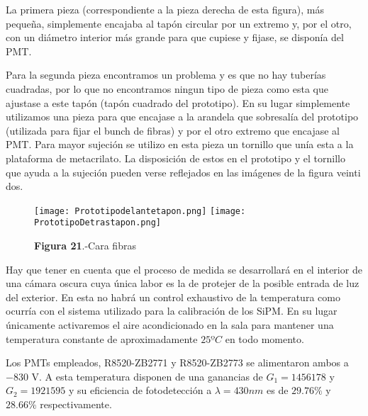 La primera pieza (correspondiente a la pieza derecha de esta figura), más pequeña, simplemente encajaba al tapón circular por un extremo y, por el otro, con un diámetro interior más grande para que cupiese y fijase, se disponía del PMT.

Para la segunda pieza encontramos un problema y es que no hay tuberías cuadradas, por lo que no encontramos ningun tipo de pieza como esta que ajustase a este tapón (tapón cuadrado del prototipo). En su lugar simplemente utilizamos una pieza para que encajase a la arandela que sobresalía del prototipo (utilizada para fijar el bunch de fibras) y por el otro extremo que encajase al PMT. Para mayor sujeción se utilizo en esta pieza un tornillo que unía esta a la plataforma de metacrilato. La disposición de estos en el prototipo y el tornillo que ayuda a la sujeción pueden verse reflejados en las imágenes de la figura veinti dos.

\begin{figure}[htb]
\centering
{
\texttt{[image: Prototipodelantetapon.png]} 
}
{
\texttt{[image: PrototipoDetrastapon.png]} 
}
\caption{\textbf{Figura 21}.-Cara fibras}
\end{figure} 

Hay que tener en cuenta que el proceso de medida se desarrollará en el interior de una cámara oscura cuya única labor es la de protejer de la posible entrada de luz del exterior. En esta no habrá un control exhaustivo de la temperatura como ocurría con el sistema utilizado para la calibración de los SiPM. En su lugar únicamente activaremos el aire acondicionado en la sala para mantener una temperatura constante de aproximadamente $25ºC$ en todo momento.

Los PMTs empleados, R8520-ZB2771 y R8520-ZB2773 se alimentaron ambos a $-830$ V. A esta temperatura disponen de una ganancias de $G_1=1456178$ y $G_2=1921595$ y su eficiencia de fotodetección a $\lambda=430nm$ es de $29.76\%$ y $28.66\%$ respectivamente. 
